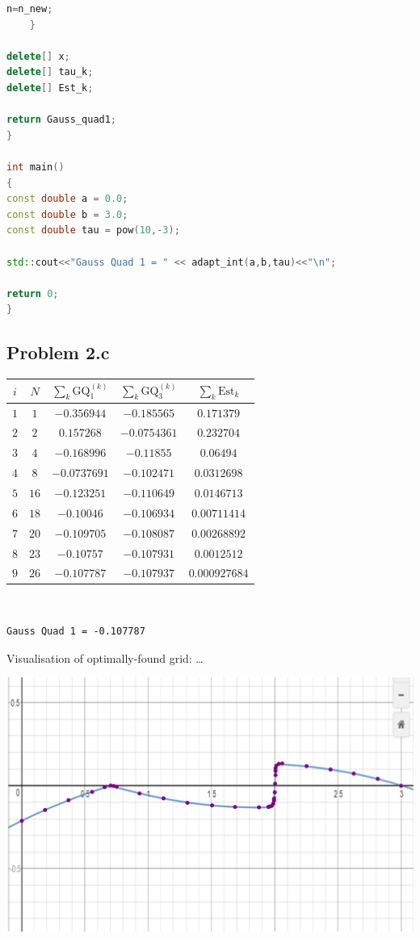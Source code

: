 \documentclass[a4paper,12pt,onecolumn,final]{article}
\begin{document}
\begin{lstlisting}[language=C++]
    n=n_new;
    }

delete[] x;
delete[] tau_k;
delete[] Est_k;

return Gauss_quad1;
}

int main()
{
const double a = 0.0;
const double b = 3.0;
const double tau = pow(10,-3);

std::cout<<"Gauss Quad 1 = " << adapt_int(a,b,tau)<<"\n";

return 0;
}


\end{lstlisting}%

\subsection*{Problem 2.c}

\begin{tabular}{c|cccc}
 $i$ & $N$ & $\sum_k \mathrm{GQ}_1^{(k)}$ & $\sum_k\mathrm{GQ}_3^{(k)}$ & $\sum_k\mathrm{Est}_k$
\\
\hline
 $1$ & $1$ & $-0.356944$ & $-0.185565$ & $0.171379$
\\
 $2$ & $2$ & $0.157268$ & $-0.0754361$ & $0.232704$
\\
 $3$ & $4$ & $-0.168996$ & $-0.11855$ & $0.06494$
\\
 $4$ & $8$ & $-0.0737691$ & $-0.102471$ & $0.0312698$
\\
 $5$ & $16$ & $-0.123251$ & $-0.110649$ & $0.0146713$
\\
 $6$ & $18$ & $-0.10046$ & $-0.106934$ & $0.00711414$
\\
 $7$ & $20$ & $-0.109705$ & $-0.108087$ & $0.00268892$
\\
 $8$ & $23$ & $-0.10757$ & $-0.107931$ & $0.0012512$
\\
 $9$ & $26$ & $-0.107787$ & $-0.107937$ & $0.000927684$

\end{tabular}
\\
\begin{verbatim}
Gauss Quad 1 = -0.107787
\end{verbatim}

Visualisation of optimally-found grid: \ldots

\includegraphics[scale=0.5]{OptimalMesh.png} 
\end{document}
